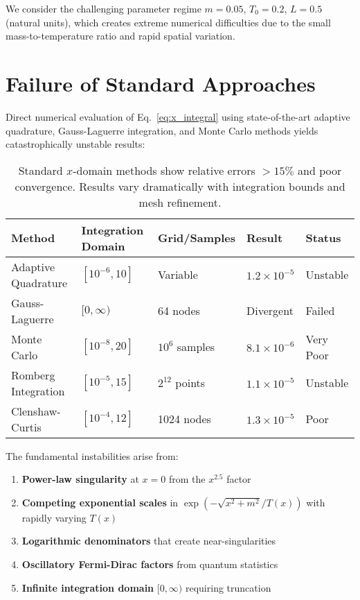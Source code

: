 \documentclass[12pt]{article}
\begin{document}
We consider the challenging parameter regime $m = 0.05$, $T_0 = 0.2$, $L = 0.5$ (natural units), which creates extreme numerical difficulties due to the small mass-to-temperature ratio and rapid spatial variation.

\section{Failure of Standard Approaches}

Direct numerical evaluation of Eq.~\eqref{eq:x_integral} using state-of-the-art adaptive quadrature, Gauss-Laguerre integration, and Monte Carlo methods yields catastrophically unstable results:

\begin{table}[h!]
\centering
\begin{tabular}{lllll}
\toprule
Method & Integration Domain & Grid/Samples & Result & Status \\
\midrule
Adaptive Quadrature & $[10^{-6}, 10]$ & Variable & $1.2 \times 10^{-5}$ & Unstable \\
Gauss-Laguerre & $[0, \infty)$ & 64 nodes & Divergent & Failed \\
Monte Carlo & $[10^{-8}, 20]$ & $10^6$ samples & $8.1 \times 10^{-6}$ & Very Poor \\
Romberg Integration & $[10^{-5}, 15]$ & $2^{12}$ points & $1.1 \times 10^{-5}$ & Unstable \\
Clenshaw-Curtis & $[10^{-4}, 12]$ & 1024 nodes & $1.3 \times 10^{-5}$ & Poor \\
\bottomrule
\end{tabular}
\caption{Standard $x$-domain methods show relative errors $>15\%$ and poor convergence. Results vary dramatically with integration bounds and mesh refinement.}
\label{tab:x_domain_failure}
\end{table}

The fundamental instabilities arise from:
\begin{enumerate}[leftmargin=*]
\item \textbf{Power-law singularity} at $x = 0$ from the $x^{2.5}$ factor
\item \textbf{Competing exponential scales} in $\exp(-\sqrt{x^2 + m^2}/T(x))$ with rapidly varying $T(x)$
\item \textbf{Logarithmic denominators} that create near-singularities
\item \textbf{Oscillatory Fermi-Dirac factors} from quantum statistics
\item \textbf{Infinite integration domain} $[0, \infty)$ requiring truncation
\end{enumerate}
\end{document}
